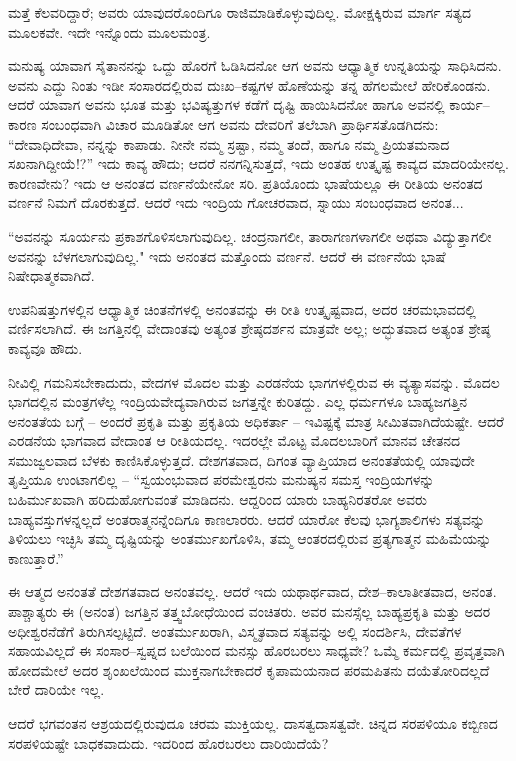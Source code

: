 ಮತ್ತೆ ಕೆಲವರಿದ್ದಾರೆ; ಅವರು ಯಾವುದರೊಂದಿಗೂ ರಾಜಿಮಾಡಿಕೊಳ್ಳುವುದಿಲ್ಲ. ಮೋಕ್ಷಕ್ಕಿರುವ ಮಾರ್ಗ ಸತ್ಯದ ಮೂಲಕವೇ. ಇದೇ ಇನ್ನೊಂದು ಮೂಲಮಂತ್ರ.

ಮನುಷ್ಯ ಯಾವಾಗ ಸೈತಾನನನ್ನು ಒದ್ದು ಹೊರಗೆ ಓಡಿಸಿದನೋ ಆಗ ಅವನು ಆಧ್ಯಾತ್ಮಿಕ ಉನ್ನತಿಯನ್ನು ಸಾಧಿಸಿದನು. ಅವನು ಎದ್ದು ನಿಂತು ಇಡೀ ಸಂಸಾರದಲ್ಲಿರುವ ದುಃಖ–ಕಷ್ಟಗಳ ಹೊಣೆಯನ್ನು ತನ್ನ ಹೆಗಲಮೇಲೆ ಹೇರಿಕೊಂಡನು. ಆದರೆ ಯಾವಾಗ ಅವನು ಭೂತ ಮತ್ತು ಭವಿಷ್ಯತ್ತುಗಳ ಕಡೆಗೆ ದೃಷ್ಟಿ ಹಾಯಿಸಿದನೋ ಹಾಗೂ ಅವನಲ್ಲಿ ಕಾರ್ಯ–ಕಾರಣ ಸಂಬಂಧವಾಗಿ ವಿಚಾರ ಮೂಡಿತೋ ಆಗ ಅವನು ದೇವರಿಗೆ ತಲೆಬಾಗಿ ಪ್ರಾರ್ಥಿಸತೊಡಗಿದನು: “ದೇವಾಧಿದೇವಾ, ನನ್ನನ್ನು ಕಾಪಾಡು. ನೀನೇ ನಮ್ಮ ಸ್ರಷ್ಟಾ, ನಮ್ಮ ತಂದೆ, ಹಾಗೂ ನಮ್ಮ ಪ್ರಿಯತಮನಾದ ಸಖನಾಗಿದ್ದೀಯೆ!?” ಇದು ಕಾವ್ಯ ಹೌದು; ಆದರೆ ನನಗನ್ನಿಸುತ್ತದೆ, ಇದು ಅಂತಹ ಉತ್ಕೃಷ್ಟ ಕಾವ್ಯದ ಮಾದರಿಯೇನಲ್ಲ. ಕಾರಣವೇನು? ಇದು ಆ ಅನಂತದ ವರ್ಣನೆಯೇನೋ ಸರಿ. ಪ್ರತಿಯೊಂದು ಭಾಷೆಯಲ್ಲೂ ಈ ರೀತಿಯ ಅನಂತದ ವರ್ಣನೆ ನಿಮಗೆ ದೊರಕುತ್ತದೆ. ಆದರೆ ಇದು ಇಂದ್ರಿಯ ಗೋಚರವಾದ, ಸ್ನಾಯು ಸಂಬಂಧವಾದ ಅನಂತ...

“ಅವನನ್ನು ಸೂರ್ಯನು ಪ್ರಕಾಶಗೊಳಿಸಲಾಗುವುದಿಲ್ಲ. ಚಂದ್ರನಾಗಲೀ, ತಾರಾಗಣಗಳಾಗಲೀ ಅಥವಾ ವಿದ್ಯುತ್ತಾಗಲೀ ಅವನನ್ನು ಬೆಳಗಲಾಗುವುದಿಲ್ಲ." ಇದು ಅನಂತದ ಮತ್ತೊಂದು ವರ್ಣನೆ. ಆದರೆ ಈ ವರ್ಣನೆಯ ಭಾಷೆ ನಿಷೇಧಾತ್ಮಕವಾಗಿದೆ.

ಉಪನಿಷತ್ತುಗಳಲ್ಲಿನ ಆಧ್ಯಾತ್ಮಿಕ ಚಿಂತನೆಗಳಲ್ಲಿ ಅನಂತವನ್ನು ಈ ರೀತಿ ಉತ್ಕೃಷ್ಟವಾದ, ಅದರ ಚರಮಭಾವದಲ್ಲಿ ವರ್ಣಿಸಲಾಗಿದೆ. ಈ ಜಗತ್ತಿನಲ್ಲಿ ವೇದಾಂತವು ಅತ್ಯಂತ ಶ್ರೇಷ್ಠದರ್ಶನ ಮಾತ್ರವೇ ಅಲ್ಲ; ಅದ್ಭುತವಾದ ಅತ್ಯಂತ ಶ್ರೇಷ್ಠ ಕಾವ್ಯವೂ ಹೌದು.

ನೀವಿಲ್ಲಿ ಗಮನಿಸಬೇಕಾದುದು, ವೇದಗಳ ಮೊದಲ ಮತ್ತು ಎರಡನೆಯ ಭಾಗಗಳಲ್ಲಿರುವ ಈ ವ್ಯತ್ಯಾಸವನ್ನು. ಮೊದಲ ಭಾಗದಲ್ಲಿನ ಮಂತ್ರಗಳೆಲ್ಲ ಇಂದ್ರಿಯವೇದ್ಯವಾಗಿರುವ ಜಗತ್ತನ್ನೇ ಕುರಿತದ್ದು. ಎಲ್ಲ ಧರ್ಮಗಳೂ ಬಾಹ್ಯಜಗತ್ತಿನ ಅನಂತತೆಯ ಬಗ್ಗೆ – ಅಂದರೆ ಪ್ರಕೃತಿ ಮತ್ತು ಪ್ರಕೃತಿಯ ಅಧಿಕರ್ತಾ – ಇವಿಷ್ಟಕ್ಕೆ ಮಾತ್ರ ಸೀಮಿತವಾಗಿದೆಯಷ್ಟೇ. ಆದರೆ ಎರಡನೆಯ ಭಾಗವಾದ ವೇದಾಂತ ಆ ರೀತಿಯದಲ್ಲ. ಇದರಲ್ಲೇ ಮೊಟ್ಟ ಮೊದಲಬಾರಿಗೆ ಮಾನವ ಚೇತನದ ಸಮುಜ್ವಲವಾದ ಬೆಳಕು ಕಾಣಿಸಿಕೊಳ್ಳುತ್ತದೆ. ದೇಶಗತವಾದ, ದಿಗಂತ ವ್ಯಾಪ್ತಿಯಾದ ಅನಂತತೆಯಲ್ಲಿ ಯಾವುದೇ ತೃಪ್ತಿಯೂ ಉಂಟಾಗಲಿಲ್ಲ – “ಸ್ವಯಂಭುವಾದ ಪರಮೇಶ್ವರನು ಮನುಷ್ಯನ ಸಮಸ್ತ ಇಂದ್ರಿಯಗಳನ್ನು ಬಹಿರ್ಮುಖವಾಗಿ ಹರಿದುಹೋಗುವಂತೆ ಮಾಡಿದನು. ಆದ್ದರಿಂದ ಯಾರು ಬಾಹ್ಯನಿರತರೋ ಅವರು ಬಾಹ್ಯವಸ್ತುಗಳನ್ನಲ್ಲದೆ ಅಂತರಾತ್ಮನನ್ನೆಂದಿಗೂ ಕಾಣಲಾರರು. ಆದರೆ ಯಾರೋ ಕೆಲವು ಭಾಗ್ಯಶಾಲಿಗಳು ಸತ್ಯವನ್ನು ತಿಳಿಯಲು ಇಚ್ಛಿಸಿ ತಮ್ಮ ದೃಷ್ಟಿಯನ್ನು ಅಂತರ್ಮುಖಗೊಳಿಸಿ, ತಮ್ಮ ಆಂತರದಲ್ಲಿರುವ ಪ್ರತ್ಯಗಾತ್ಮನ ಮಹಿಮೆಯನ್ನು ಕಾಣುತ್ತಾರೆ.”

ಈ ಆತ್ಮದ ಅನಂತತೆ ದೇಶಗತವಾದ ಅನಂತವಲ್ಲ. ಆದರೆ ಇದು ಯಥಾರ್ಥವಾದ, ದೇಶ–ಕಾಲಾತೀತವಾದ, ಅನಂತ. ಪಾಶ್ಚಾತ್ಯರು ಈ (ಅನಂತ) ಜಗತ್ತಿನ ತತ್ತ್ವಬೋಧೆಯಿಂದ ವಂಚಿತರು. ಅವರ ಮನಸ್ಸೆಲ್ಲ ಬಾಹ್ಯಪ್ರಕೃತಿ ಮತ್ತು ಅದರ ಅಧೀಶ್ವರನೆಡೆಗೆ ತಿರುಗಿಸಲ್ಪಟ್ಟಿದೆ. ಅಂತರ್ಮುಖರಾಗಿ, ವಿಸ್ಮೃತವಾದ ಸತ್ಯವನ್ನು ಅಲ್ಲಿ ಸಂದರ್ಶಿಸಿ, ದೇವತೆಗಳ ಸಹಾಯವಿಲ್ಲದೆ ಈ ಸಂಸಾರ–ಸ್ವಪ್ನದ ಬಲೆಯಿಂದ ಮನಸ್ಸು ಹೊರಬರಲು ಸಾಧ್ಯವೇ? ಒಮ್ಮೆ ಕರ್ಮದಲ್ಲಿ ಪ್ರವೃತ್ತವಾಗಿ ಹೋದಮೇಲೆ ಅದರ ಶೃಂಖಲೆಯಿಂದ ಮುಕ್ತನಾಗಬೇಕಾದರೆ ಕೃಪಾಮಯನಾದ ಪರಮಪಿತನು ದಯೆತೋರಿದಲ್ಲದೆ ಬೇರೆ ದಾರಿಯೇ ಇಲ್ಲ.

ಆದರೆ ಭಗವಂತನ ಆಶ್ರಯದಲ್ಲಿರುವುದೂ ಚರಮ ಮುಕ್ತಿಯಲ್ಲ. ದಾಸತ್ವ\break ದಾಸತ್ವವೇ. ಚಿನ್ನದ ಸರಪಳಿಯೂ ಕಬ್ಬಿಣದ ಸರಪಳಿಯಷ್ಟೇ ಬಾಧಕವಾದುದು. ಇದರಿಂದ ಹೊರಬರಲು ದಾರಿಯಿದೆಯೆ?

